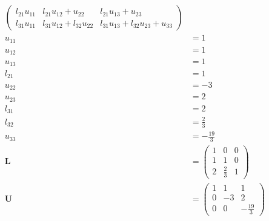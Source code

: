 \documentclass{article}
\begin{document}
\begin{align*}
\begin{pmatrix}
                                      l_{21} u_{11} & l_{21} u_{12} + u_{22}        & l_{21} u_{13} + u_{23}                 \\
                                      l_{31} u_{11} & l_{31} u_{12} + l_{32} u_{22} & l_{31} u_{13} + l_{32} u_{23} + u_{33}
                                    \end{pmatrix} \\
  u_{11}                        & = 1                                                                                      \\
  u_{12}                        & = 1                                                                                      \\
  u_{13}                        & = 1                                                                                      \\
  l_{21}                        & = 1                                                                                      \\
  u_{22}                        & = -3                                                                                     \\
  u_{23}                        & = 2                                                                                      \\
  l_{31}                        & = 2                                                                                      \\
  l_{32}                        & = \frac{2}{3}                                                                            \\
  u_{33}                        & = -\frac{19}{3}                                                                          \\
  \mathbf{L}                    & = \begin{pmatrix}
                                      1 & 0           & 0 \\
                                      1 & 1           & 0 \\
                                      2 & \frac{2}{3} & 1
                                    \end{pmatrix}                                                                    \\
  \mathbf{U}                    & = \begin{pmatrix}
                                      1 & 1  & 1             \\
                                      0 & -3 & 2             \\
                                      0 & 0  & -\frac{19}{3}
                                    \end{pmatrix}
\end{align*}
\end{document}
